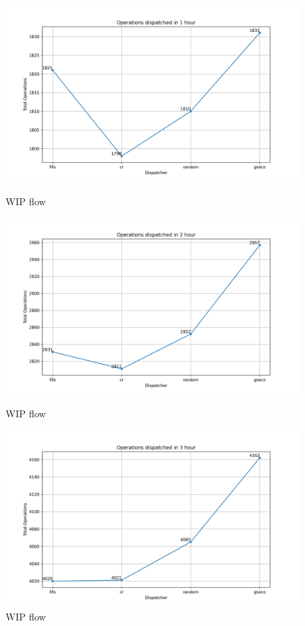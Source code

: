 \documentclass[runningheads]{llncs}
\begin{document}
\begin{figure}[t]
	\centering
	\begin{minipage}{0.32\textwidth}
		\includegraphics[width=\textwidth]{total_operations_3600s.png}
		\caption{WIP flow}
		\label{fig:o1}
	\end{minipage}\hfill
	\begin{minipage}{0.32\textwidth}
		\includegraphics[width=\textwidth]{total_operations_7200s.png}
		\caption{WIP flow}
		\label{fig:o2}
	\end{minipage}\hfill
	\begin{minipage}{0.32\textwidth}
		\includegraphics[width=\textwidth]{total_operations_10800s.png}
		\caption{WIP flow}
		\label{fig:o3}
	\end{minipage}
\end{figure}
\end{document}
